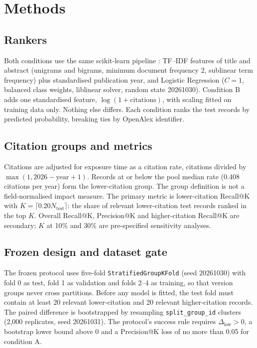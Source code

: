 \documentclass[acmsmall,screen,nonacm]{acmart}
\begin{document}
\section{Methods}
\label{sec:methods}

\subsection{Rankers}

Both conditions use the same scikit-learn pipeline \cite{pedregosa2011scikit}: TF--IDF features of title
and abstract (unigrams and bigrams, minimum document frequency 2, sublinear term frequency) plus
standardised publication year, and Logistic Regression ($C = 1$, balanced class weights, liblinear
solver, random state 20261030). Condition B adds one standardised feature,
$\log(1 + \text{citations})$, with scaling fitted on training data only. Nothing else differs. Each
condition ranks the test records by predicted probability, breaking ties by OpenAlex identifier.

\subsection{Citation groups and metrics}

Citations are adjusted for exposure time as a citation rate, citations divided by
$\max(1, 2026 - \text{year} + 1)$. Records at or below the pool median rate (0.408 citations per year)
form the lower-citation group. The group definition is not a field-normalised impact measure. The
primary metric is lower-citation Recall@K with $K = \lceil 0.20 N_{\text{test}} \rceil$: the share of
relevant lower-citation test records ranked in the top $K$. Overall Recall@K, Precision@K and
higher-citation Recall@K are secondary; $K$ at 10\% and 30\% are pre-specified sensitivity analyses.

\subsection{Frozen design and dataset gate}

The frozen protocol uses five-fold \texttt{StratifiedGroupKFold} (seed 20261030) with fold 0 as test,
fold 1 as validation and folds 2--4 as training, so that version groups never cross partitions. Before
any model is fitted, the test fold must contain at least 20 relevant lower-citation and 20 relevant
higher-citation records. The paired difference is bootstrapped by resampling \texttt{split\_group\_id}
clusters (2,000 replicates, seed 20261031). The protocol's success rule requires $\Delta_{\text{low}} > 0$,
a bootstrap lower bound above 0 and a Precision@K loss of no more than 0.05 for condition A.
\end{document}
